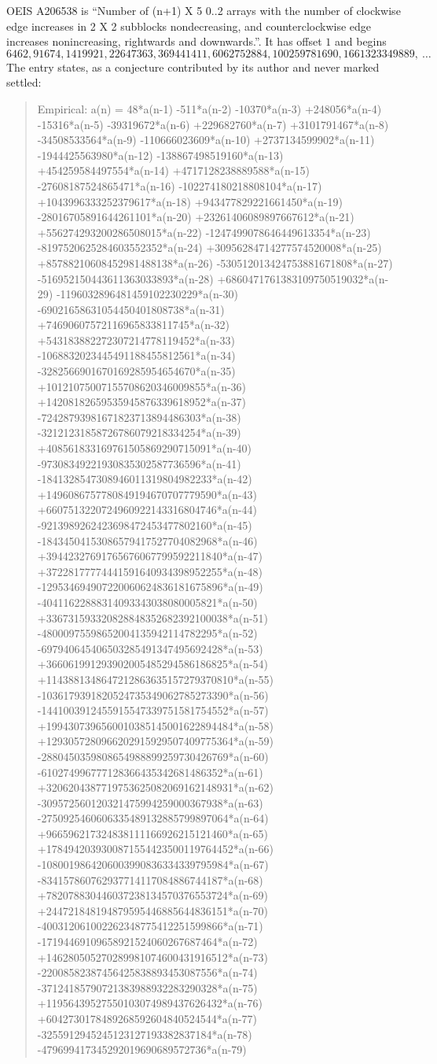 \documentclass[11pt,a4paper]{article}
\theoremstyle{plain}
\theoremstyle{definition}
\begin{document}
OEIS A206538 is ``Number of (n+1) X 5 0..2 arrays with the number of clockwise edge increases in 2 X 2 subblocks nondecreasing, and counterclockwise edge increases nonincreasing, rightwards and downwards.''. It has offset $1$ and begins
\[
6462, 91674, 1419921, 22647363, 369441411, 6062752884, 100259781690, 1661323349889,\ \dots
\]
The entry states, as a conjecture contributed by its author and never marked settled:
\begin{quote}
Empirical: a(n) = 48*a(n-1) -511*a(n-2) -10370*a(n-3) +248056*a(n-4) -15316*a(n-5) -39319672*a(n-6) +229682760*a(n-7) +3101791467*a(n-8) -34508533564*a(n-9) -110666023609*a(n-10) +2737134599902*a(n-11) -1944425563980*a(n-12) -138867498519160*a(n-13) +454259584497554*a(n-14) +4717128238889588*a(n-15) -27608187524865471*a(n-16) -102274180218808104*a(n-17) +1043996333252379617*a(n-18) +943477829221661450*a(n-19) -28016705891644261101*a(n-20) +23261406089897667612*a(n-21) +556274293200286508015*a(n-22) -1247499078646449613354*a(n-23) -8197520625284603552352*a(n-24) +30956284714277574520008*a(n-25) +85788210608452981488138*a(n-26) -530512013424753881671808*a(n-27) -516952150443611363033893*a(n-28) +6860471761383109750519032*a(n-29) -1196032896481459102230229*a(n-30) -69021658631054450401808738*a(n-31) +74690607572116965833811745*a(n-32) +543183882272307214778119452*a(n-33) -1068832023445491188455812561*a(n-34) -3282566901670169285954654670*a(n-35) +10121075007155708620346009855*a(n-36) +14208182659535945876339618952*a(n-37) -72428793981671823713894486303*a(n-38) -32121231858726786079218334254*a(n-39) +408561833169761505869290715091*a(n-40) -97308349221930835302587736596*a(n-41) -1841328547308946011319804982233*a(n-42) +1496086757780849194670707779590*a(n-43) +6607513220724960922143316804746*a(n-44) -9213989262423698472453477802160*a(n-45) -18434504153086579417527704082968*a(n-46) +39442327691765676067799592211840*a(n-47) +37228177774441591640934398952255*a(n-48) -129534694907220060624836181675896*a(n-49) -40411622888314093343038080005821*a(n-50) +336731593320828848352682392100038*a(n-51) -48000975598652004135942114782295*a(n-52) -697940645406503285491347495692428*a(n-53) +366061991293902005485294586186825*a(n-54) +1143881348647212863635157279370810*a(n-55) -1036179391820524735349062785273390*a(n-56) -1441003912455915547339751581754552*a(n-57) +1994307396560010385145001622894484*a(n-58) +1293057280966202915929507409775364*a(n-59) -2880450359808654988899259730426769*a(n-60) -610274996777128366435342681486352*a(n-61) +3206204387719753625082069162148931*a(n-62) -309572560120321475994259000367938*a(n-63) -2750925460606335489132885799897064*a(n-64) +966596217324838111166926215121460*a(n-65) +1784942039300871554423500119764452*a(n-66) -1080019864206003990836334339795984*a(n-67) -834157860762937714117084886744187*a(n-68) +782078830446037238134570376553724*a(n-69) +244721848194879595446885644836151*a(n-70) -400312061002262348775412251599866*a(n-71) -17194469109658921524060267687464*a(n-72) +146280505270289981074600431916512*a(n-73) -22008582387456425838893453087556*a(n-74) -37124185790721383988932283290328*a(n-75) +11956439527550103074989437626432*a(n-76) +6042730178489268592604840524544*a(n-77) -3255912945245123127193382837184*a(n-78) -479699417345292019690689572736*a(n-79) 
\end{quote}
\end{document}
